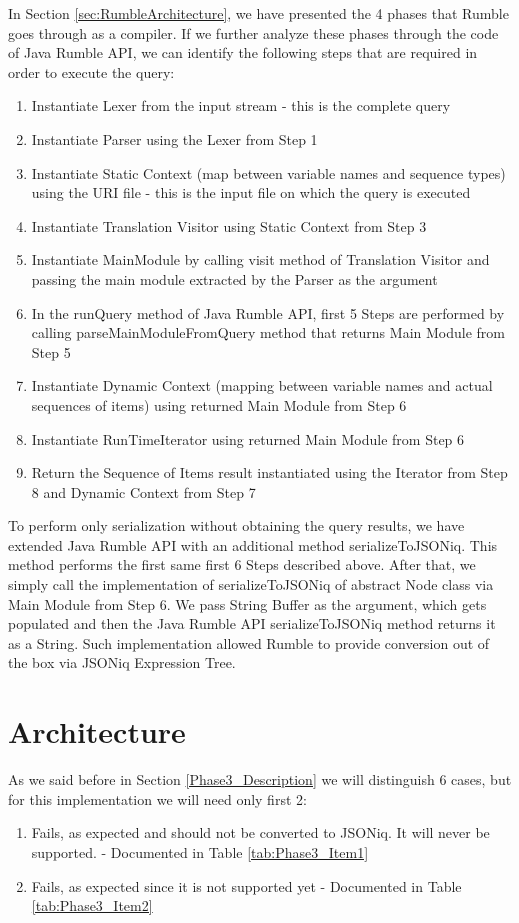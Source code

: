 In Section \ref{sec:RumbleArchitecture}, we have presented the 4 phases that Rumble goes through as a compiler. If we further analyze these phases through the code of Java Rumble API, we can identify the following steps that are required in order to execute the query:
\begin{enumerate}
	\item Instantiate Lexer from the input stream - this is the complete query
	\item Instantiate Parser using the Lexer from Step 1
	\item Instantiate Static Context  (map between variable names and sequence types) using the URI file - this is the input file on which the query is executed 
	\item Instantiate Translation Visitor using Static Context from Step 3
	\item Instantiate MainModule by calling visit method of Translation Visitor and passing the main module extracted by the Parser as the argument
	\item In the runQuery method of Java Rumble API, first 5 Steps are performed by calling parseMainModuleFromQuery method that returns Main Module from Step 5
	\item Instantiate Dynamic Context (mapping between variable names and actual sequences of items) using returned Main Module from Step 6
	\item Instantiate RunTimeIterator using returned Main Module from Step 6
	\item Return the Sequence of Items result instantiated using the Iterator from Step 8 and Dynamic Context from Step 7
\end{enumerate}

To perform only serialization without obtaining the query results, we have extended Java Rumble API with an additional method serializeToJSONiq. This method performs the first same first 6 Steps described above. After that, we simply call the implementation of serializeToJSONiq of abstract Node class via Main Module from Step 6. We pass String Buffer as the argument, which gets populated and then the Java Rumble API serializeToJSONiq method returns it as a String. Such implementation allowed Rumble to provide conversion out of the box via JSONiq Expression Tree.

\section{Architecture}
\label{sec:TestConverterImplementation}
As we said before in Section \ref{Phase3_Description} we will distinguish 6 cases, but for this implementation we will need only first 2: 
\begin{enumerate}
	\item Fails, as expected and should not be converted to JSONiq. It will never be supported. - Documented in Table \ref{tab:Phase3_Item1}
	\item Fails, as expected since it is not supported yet - Documented in Table \ref{tab:Phase3_Item2}
\end{enumerate}

